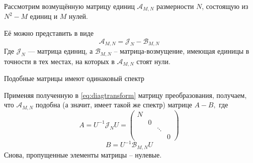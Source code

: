 Рассмотрим возмущённую матрицу единиц
\( \mathscr{A}_{M,N} \) размерности \( N \),
состоящую из \( N^2 - M \) единиц и \( M \) нулей.

Её можно представить в виде
\[
    \mathscr{A}_{M,N} = \mathscr{J}_{N} - \mathscr{B}_{M,N}
    \]
Где \( \mathscr{J}_{N} \) --- матрица единиц,
а \( \mathscr{B}_{M,N} \) -- матрица-возмущение,
имеющая единицы в точности в тех местах,
на которых в \( \mathscr{A}_{M,N} \) стоят нули.

\begin{prop}
    Подобные матрицы имеют одинаковый спектр
\end{prop}

Применяя полученную в \eqref{eq:diagtransform} матрицу преобразования,
получаем, что \( \mathscr{A}_{M,N} \) подобна (а значит, имеет такой же спектр)
матрице
\( A - B, \)
где
\[
    A = {U^{-1}}{\mathscr{J}_{N}}{U}
    = \begin{pmatrix}
      N &   &        & \\
        & 0 &        & \\
        &   & \ddots & \\
        &   &        & 0
        \end{pmatrix}
        \]
\[
    B = {U^{-1}}{\mathscr{B}_{M,N}}{U}
    \]
Снова, пропущенные элементы матрицы -- нулевые.
